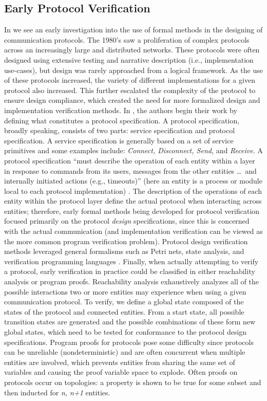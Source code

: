 \documentclass[12pt, fullpage]{article}
\begin{document}
\subsection{Early Protocol Verification}
In \cite{Bochman1980} we see an early investigation into the use of formal methods in the designing of communication protocols. The 1980's saw a proliferation of complex protocols across an increasingly large and distributed networks. These protocols were often designed using extensive testing and narrative description (i.e., implementation use-cases), but design was rarely approached from a logical framework. As the use of these protocols increased, the variety of different implementations for a given protocol also increased. This further escalated the complexity of the protocol to ensure design compliance, which created the need for more formalized design and implementation verification methods. 
\bigbreak
In \cite{Bochman1980}, the authors begin their work by defining what constitutes a protocol specification. A protocol specification, broadly speaking, consists of two parts: service specification and protocol specification. A service specification is generally based on a set of service primitives and some examples include: \textit{Connect, Disconnect, Send,} and \textit{Receive}. A protocol specification ``must describe the operation of each entity within a layer in response to commands from its users, messages from the other entities \ldots\ and internally initiated actions (e.g., timeouts)'' (here an entity is a process or module local to each protocol implementation) \cite{Bochman1980}. The description of the operations of each entity within the protocol layer define the actual protocol when interacting across entities; therefore, early formal methods being developed for protocol verification focused primarily on the protocol \textit{design} specifications, since this is concerned with the actual communication (and implementation verification can be viewed as the more common program verification problem). Protocol design verification methods leveraged general formalisms such as Petri nets, state analysis, and verification programming languages \cite{Petri1966}. 
\bigbreak
Finally, when actually attempting to verify a protocol, early verification in practice could be classified in either reachability analysis or program proofs. Reachability analysis exhaustively analyzes all of the possible interactions two or more entities may experience when using a given communication protocol. To verify, we define a global state composed of the states of the protocol and connected entities. From a start state, all possible transition states are generated and the possible combinations of these form new global states, which need to be tested for conformance to the protocol design specifications. Program proofs for protocols pose some difficulty since protocols can be unreliable (nondeterministic) and are often concurrent when multiple entities are involved, which prevents entities from sharing the same set of variables and causing the proof variable space to explode. Often proofs on protocols occur on topologies: a property is shown to be true for some subset and then inducted for \textit{n, n+1} entities. 
\end{document}
